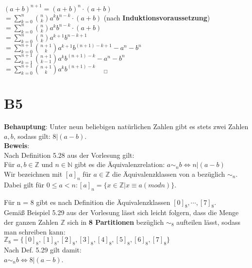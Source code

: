 \documentclass[11pt,a4paper]{article}
\begin{document}
$(a + b)^{n+1} = (a + b)^n \cdot (a+b)$ \\
$= \sum \limits_{k=0}^{n}\binom{n}{k}a^kb^{n-k} \cdot (a+b)$  (nach \textbf{Induktionsvoraussetzung}) \\
$= \sum \limits_{k=0}^{n}\binom{n}{k}a^kb^{n-k} \cdot (a+b)$ \\
$= \sum \limits_{k=0}^{n}\binom{n}{k}a^{k+1}b^{n-k+1}$ \\
$= \sum \limits_{k=0}^{n+1}\binom{n+1}{k}a^{k+1}b^{(n+1)-k+1} - a^n - b^n$ \\
$= \sum \limits_{k=1}^{n+1}\binom{n+1}{k-1}a^{k}b^{(n+1)-k} - a^n - b^n$ \\
$= \sum \limits_{k=0}^{n+1}\binom{n+1}{k}a^{k}b^{(n+1)-k}$    $~~~~_{\Box}$\\


\section*{B5}
\textbf{Behauptung}: Unter neun beliebigen natürlichen Zahlen gibt es stets zwei Zahlen $a,b$, sodass gilt: $8|(a-b)$.\\

\textbf{Beweis}: \\

Nach Definition 5.28 aus der Vorlesung gilt: \\

Für $a, b \in \mathbb{Z}$ und $n \in \mathbb{N}$ gibt es die Äquivalenzrelation: 
$a \sim_n b \Leftrightarrow n | (a-b)$ \\
Wir bezeichnen mit $[a]_n$ für $a \in \mathbb{Z}$ die Äquivalenzklassen von a bezüglich $\sim_n$. \\
Dabei gilt für $0 \leq a < n: [a]_n = \{x \in \mathbb{Z} | x \equiv a (mod n)\}$.

Für n = 8 gibt es nach Definition die Äquivalenzklassen $[0]_8,\cdots,[7]_8$. \\
Gemäß Beispiel 5.29 aus der Vorlesung lässt sich leicht folgern, dass die Menge der ganzen Zahlen $\mathbb{Z}$ sich in \textbf{8 Partitionen} bezüglich $\sim_8$ aufteilen lässt, sodass man schreiben kann: \\

$\mathbb{Z}_8 = \{[0]_8, [1]_8, [2]_8, [3]_8, [4]_8, [5]_8, [6]_8, [7]_8\}$ \\

Nach Def. 5.29 gilt damit: \\

$a \sim_n b \Leftrightarrow 8 | (a-b)$. \\
\end{document}
